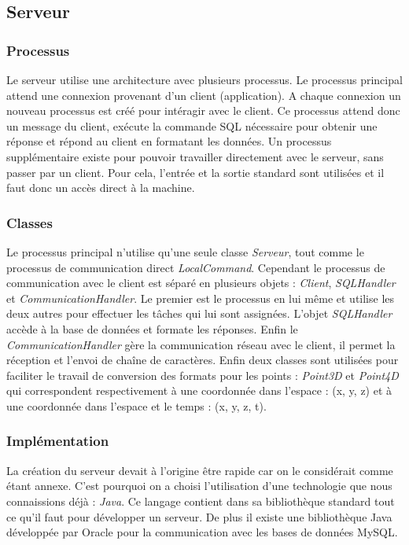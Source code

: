 \subsection{Serveur}
\subsubsection{Processus}
Le serveur utilise une architecture avec plusieurs processus. Le processus principal attend une connexion provenant d'un client (application).
A chaque connexion un nouveau processus est créé pour intéragir avec le client. Ce processus attend donc un message du client, exécute la commande
SQL nécessaire pour obtenir une réponse et répond au client en formatant les données. Un processus supplémentaire existe pour pouvoir
travailler directement avec le serveur, sans passer par un client. Pour cela, l'entrée et la sortie standard sont utilisées et il faut donc un accès direct à la machine.
\subsubsection{Classes}
Le processus principal n'utilise qu'une seule classe \emph{Serveur}, tout comme le processus de communication direct \emph{LocalCommand}.
Cependant le processus de communication avec le client est séparé en plusieurs objets : \emph{Client}, \emph{SQLHandler} et \emph{CommunicationHandler}. 
Le premier est le processus en lui même et utilise les deux autres pour effectuer les tâches qui lui sont assignées. L'objet \emph{SQLHandler} accède à la base de données et formate les réponses.
Enfin le \emph{CommunicationHandler} gère la communication réseau avec le client, il permet la réception et l'envoi de chaîne de caractères.
Enfin deux classes sont utilisées pour faciliter le travail de conversion des formats pour les points : \emph{Point3D} et \emph{Point4D} qui correspondent respectivement à une coordonnée dans l'espace : (x, y, z)
et à une coordonnée dans l'espace et le temps : (x, y, z, t).

\subsubsection{Implémentation}
La création du serveur devait à l'origine être rapide car on le considérait comme étant annexe. C'est pourquoi on a choisi l'utilisation d'une
technologie que nous connaissions déjà : \emph{Java}. Ce langage contient dans sa bibliothèque standard tout ce qu'il faut pour développer un serveur.
De plus il existe une bibliothèque Java développée par Oracle pour la communication avec les bases de données MySQL.

